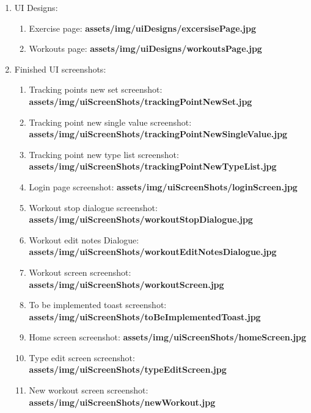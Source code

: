 \documentclass{article}
\begin{document}
\begin{multicols}{2}
\begin{enumerate}
\begin{enumerate}
    \end{enumerate}
  \item UI Designs:
    \begin{enumerate}
      \item Exercise page: \textbf{assets/img/uiDesigns/excersisePage.jpg}\\
      \item Workouts page: \textbf{assets/img/uiDesigns/workoutsPage.jpg}\\ 
    \end{enumerate}
  \item Finished UI screenshots:
    \begin{enumerate} 
      \item Tracking points new set screenshot: \textbf{assets/img/uiScreenShots/trackingPointNewSet.jpg}\\
      \item Tracking point new single value screenshot: \textbf{assets/img/uiScreenShots/trackingPointNewSingleValue.jpg}\\
      \item Tracking point new type list screenshot: \textbf{assets/img/uiScreenShots/trackingPointNewTypeList.jpg}\\
      \item Login page screenshot: \textbf{assets/img/uiScreenShots/loginScreen.jpg}\\ 
      \item Workout stop dialogue screenshot: \textbf{assets/img/uiScreenShots/workoutStopDialogue.jpg}\\
      \item Workout edit notes Dialogue: \textbf{assets/img/uiScreenShots/workoutEditNotesDialogue.jpg}\\ 
      \item Workout screen screenshot: \textbf{assets/img/uiScreenShots/workoutScreen.jpg}\\
      \item To be implemented toast screenshot: \textbf{assets/img/uiScreenShots/toBeImplementedToast.jpg}\\
      \item Home screen screenshot: \textbf{assets/img/uiScreenShots/homeScreen.jpg}\\ 
      \item Type edit screen screenshot: \textbf{assets/img/uiScreenShots/typeEditScreen.jpg}\\
      \item New workout screen screenshot: \textbf{assets/img/uiScreenShots/newWorkout.jpg}\\

\end{enumerate}
\end{enumerate}
\end{multicols}
\end{document}
